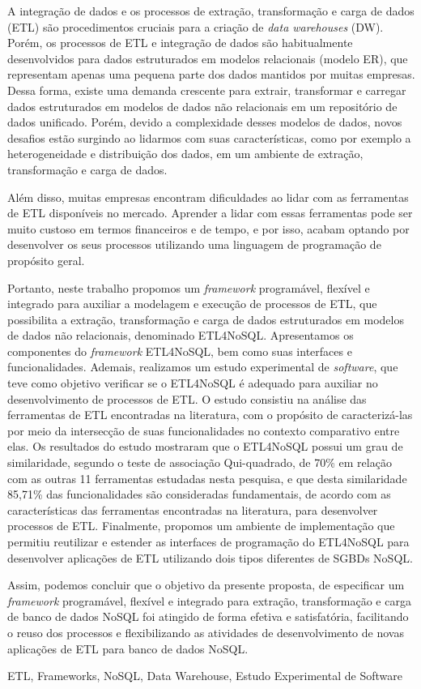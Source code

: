
A integração de dados e os processos de extração, transformação e carga de dados (ETL) são procedimentos cruciais para a criação de \textit{data warehouses} (DW). Porém, os processos de ETL e integração de dados são habitualmente desenvolvidos para dados estruturados em modelos relacionais (modelo ER), que representam apenas uma pequena parte dos dados mantidos por muitas empresas. Dessa forma, existe uma demanda crescente para extrair, transformar e carregar dados estruturados em modelos de dados não relacionais em um repositório de dados unificado. Porém, devido a complexidade desses modelos de dados, novos desafios estão surgindo ao lidarmos com suas características, como por exemplo a heterogeneidade e distribuição dos dados, em um ambiente de extração, transformação e carga de dados.

Além disso, muitas empresas encontram dificuldades ao lidar com as ferramentas de ETL disponíveis no mercado. Aprender a lidar com essas ferramentas pode ser muito custoso em termos financeiros e de tempo, e por isso, acabam optando por desenvolver os seus processos utilizando uma linguagem de programação de propósito geral.

Portanto, neste trabalho propomos um \textit{framework} programável, flexível e integrado para auxiliar a modelagem e execução de processos de ETL, que possibilita a extração, transformação e carga de dados estruturados em modelos de dados não relacionais, denominado ETL4NoSQL. Apresentamos os componentes do \textit{framework} ETL4NoSQL, bem como suas interfaces e funcionalidades. Ademais, realizamos um estudo experimental de \textit{software}, que teve como objetivo verificar se o ETL4NoSQL é adequado para auxiliar no desenvolvimento de processos de ETL. O estudo consistiu na análise das ferramentas de ETL encontradas na literatura, com o propósito de caracterizá-las por meio da intersecção de suas funcionalidades no contexto comparativo entre elas. Os resultados do estudo mostraram que o ETL4NoSQL possui um grau de similaridade, segundo o teste de associação Qui-quadrado, de 70\% em relação com as outras 11 ferramentas estudadas nesta pesquisa, e que desta similaridade 85,71\% das funcionalidades são consideradas fundamentais, de acordo com as características das ferramentas encontradas na literatura, para desenvolver processos de ETL. Finalmente, propomos um ambiente de implementação que permitiu reutilizar e estender as interfaces de programação do ETL4NoSQL para desenvolver aplicações de ETL utilizando dois tipos diferentes de SGBDs NoSQL.

Assim, podemos concluir que o objetivo da presente proposta, de especificar um \textit{framework} programável, flexível e integrado para extração, transformação e carga de banco de dados NoSQL foi atingido de forma efetiva e satisfatória, facilitando o reuso dos processos e flexibilizando as atividades de desenvolvimento de novas aplicações de ETL para banco de dados NoSQL.

\begin{keywords}
ETL, Frameworks, NoSQL, Data Warehouse, Estudo Experimental de Software
\end{keywords}